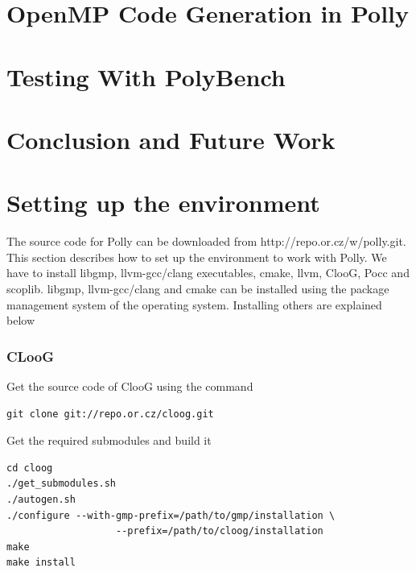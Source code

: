 \documentclass[MTech]{iitmdiss}
\begin{document}
\chapter{OpenMP Code Generation in Polly}


\chapter{Testing With PolyBench}

\chapter{Conclusion and Future Work}



%




\appendix
\chapter{Setting up the environment}
The source code for Polly can be downloaded from http://repo.or.cz/w/polly.git. This section describes
how to set up the environment to work with Polly. We have to install libgmp, llvm-gcc/clang executables,
cmake, llvm, ClooG, Pocc and scoplib. libgmp, llvm-gcc/clang and cmake can be installed using the package
management system of the operating system. Installing others are explained below

\subsection{CLooG}
\noindent
Get the source code of ClooG using the command
\begin{lstlisting}
git clone git://repo.or.cz/cloog.git
\end{lstlisting}
\noindent
Get the required submodules and build it
\begin{lstlisting}
cd cloog
./get_submodules.sh
./autogen.sh
./configure --with-gmp-prefix=/path/to/gmp/installation \ 
                   --prefix=/path/to/cloog/installation
make
make install
\end{lstlisting}
\end{document}
